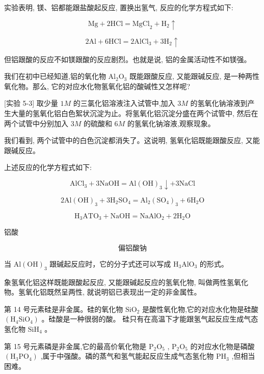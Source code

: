 \documentclass[10pt]{article}
\begin{document}
实验表明, 镁、铝都能跟盐酸起反应, 置换出氢气, 反应的化学方程式如下:

\[
\mathrm{{Mg}} + 2\mathrm{{HCl}} = {\mathrm{{MgCl}}}_{2} + {\mathrm{H}}_{2} \uparrow
\]

\[
2\mathrm{{Al}} + 6\mathrm{{HCl}} = 2{\mathrm{{AlCl}}}_{3} + 3{\mathrm{H}}_{2} \uparrow
\]

但铝跟酸的反应不如镁跟酸的反应剧烈。也就是说, 铝的金属活动性不如镁强。

我们在初中已经知道,铝的氧化物 \({\mathrm{{Al}}}_{2}{\mathrm{O}}_{3}\) 既能跟酸反应, 又能跟碱反应, 是一种两性氧化物。那么, 它的对应水化物氢氧化铝的酸碱性又怎样呢?

[实验 5-3] 取少量 \({1M}\) 的三氯化铝溶液注入试管中,加入 \({3M}\) 的氢氧化钠溶液到产生大量的氢氧化铝白色絮状沉淀为止。将氢氧化铝沉淀分盛在两个试管中, 然后在两个试管中分别加入 \({3M}\) 的硫酸和 \({6M}\) 的氢氧化钠溶液,观察现象。

我们看到, 两个试管中的白色沉淀都消失了。这说明, 氢氧化铝既能跟酸反应, 又能跟碱反应。

上述反应的化学方程式如下:

\[
{\mathrm{{AlCl}}}_{3} + 3\mathrm{{NaOH}} = \mathrm{{Al}}{\left( \mathrm{{OH}}\right) }_{3} \downarrow + 3\mathrm{{NaCl}}
\]

\[
2\mathrm{{Al}}{\left( \mathrm{{OH}}\right) }_{3} + 3{\mathrm{H}}_{2}{\mathrm{{SO}}}_{4} = {\mathrm{{Al}}}_{2}{\left( {\mathrm{{SO}}}_{4}\right) }_{3} + 6{\mathrm{H}}_{2}\mathrm{O}
\]

\[
{\mathrm{H}}_{3}{\mathrm{{ATO}}}_{3} + \mathrm{{NaOH}} = {\mathrm{{NaAlO}}}_{2} + 2{\mathrm{H}}_{2}\mathrm{O}
\]

铝酸

\[
\text{偏铝酸钠}
\]

当 \(\mathrm{{Al}}{\left( \mathrm{{OH}}\right) }_{3}\) 跟碱起反应时，它的分子式还可以写成 \({\mathrm{H}}_{3}{\mathrm{{AlO}}}_{3}\) 的形式。

象氢氧化铝这样既能跟酸起反应, 又能跟碱起反应的氢氧化物, 叫做两性氢氧化物。氢氧化铝既然呈两性, 就说明铝已表现出一定的非金属性。

第 14 号元素硅是非金属。硅的氧化物 \({\mathrm{{SiO}}}_{2}\) 是酸性氧化物,它的对应水化物是硅酸 \(\left( {{\mathrm{H}}_{4}{\mathrm{{SiO}}}_{4}}\right)\) 。硅酸是一种很弱的酸。 硅只有在高温下才能跟氢气起反应生成气态氢化物 \({\mathrm{{SiH}}}_{4}\) 。

第 15 号元素磷是非金属,它的最高价氧化物是 \({\mathrm{P}}_{2}{\mathrm{O}}_{5}\) , \({\mathrm{P}}_{2}{\mathrm{O}}_{5}\) 的对应水化物是磷酸 \(\left( {{\mathrm{H}}_{3}{\mathrm{{PO}}}_{4}}\right)\) ,属于中强酸。磷的蒸气和氢气能起反应生成气态氢化物 \({\mathrm{{PH}}}_{3}\) ,但相当困难。
\end{document}
